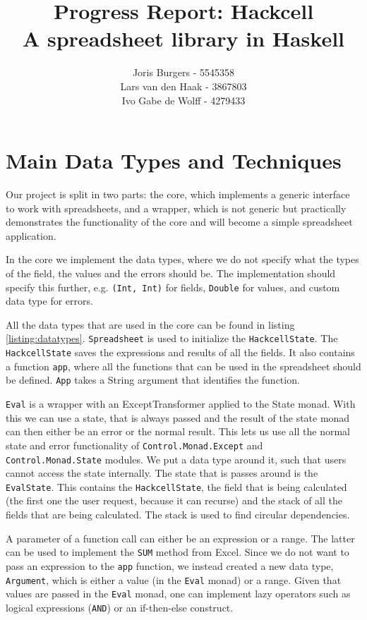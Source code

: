 \documentclass{article}
\title{
	Progress Report: Hackcell \\
	\vskip 0.5cm
	\large{A spreadsheet library in Haskell}
}
\author{Joris Burgers - 5545358\\ Lars van den Haak - 3867803\\ Ivo Gabe de Wolff - 4279433}
\begin{document}
	\maketitle
	\section{Main Data Types and Techniques}
	Our project is split in two parts: the core, which implements a generic interface to work with spreadsheets, and a wrapper, which is not generic but practically demonstrates the functionality of the core and will become a simple spreadsheet application.
	
	In the core we implement the data types, where we do not specify what the types of the field, the values and the errors should be. The implementation should specify this further, e.g. \texttt{(Int, Int)} for fields, \texttt{Double} for values, and custom data type for errors.
	
	All the data types that are used in the core can be found in listing \ref{listing:datatypes}. \texttt{Spreadsheet} is used to initialize the \texttt{HackcellState}. The \texttt{HackcellState} saves the expressions and results of all the fields. It also contains a function \texttt{app}, where all the functions that can be used in the spreadsheet should be defined. \texttt{App} takes a String argument that identifies the function.
	
	\texttt{Eval} is a wrapper with an ExceptTransformer applied to the State monad. With this we can use a state, that is always passed and the result of the state monad can then either be an error or the normal result. This lets us use all the normal state and error functionality of \texttt{Control.Monad.Except} and \texttt{Control.Monad.State} modules. We put a data type around it, such that users cannot access the state internally. The state that is passes around is the \texttt{EvalState}. This contains the \texttt{HackcellState}, the field that is being calculated (the first one the user request, because it can recurse) and the stack of all the fields that are being calculated. The stack is used to find circular dependencies.
	
	A parameter of a function call can either be an expression or a range. The latter can be used to implement the \texttt{SUM} method from Excel. Since we do not want to pass an expression to the \texttt{app} function, we instead created a new data type, \texttt{Argument}, which is either a value (in the \texttt{Eval} monad) or a range. Given that values are passed in the \texttt{Eval} monad, one can implement lazy operators such as logical expressions (\texttt{AND}) or an if-then-else construct.
	
\end{document}
